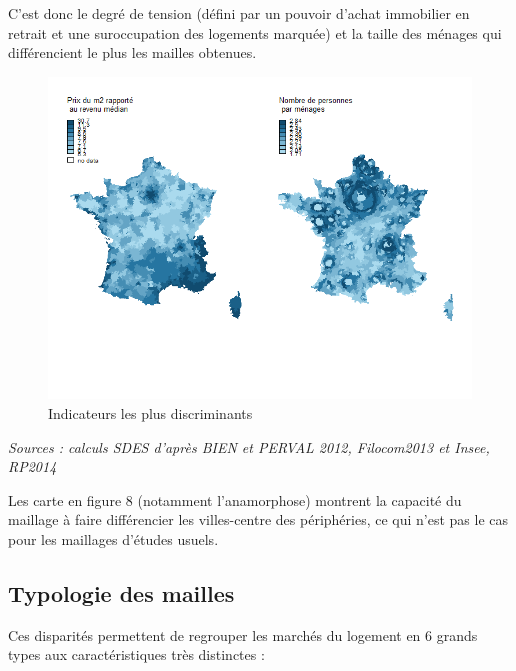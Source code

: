 \documentclass[12pt, a4paper]{article}
\begin{document}
C'est donc le degré de tension (défini par un pouvoir d'achat immobilier en retrait et une suroccupation des logements marquée) et la taille des ménages qui différencient le plus les mailles obtenues. 



\begin{figure}[H]
\caption{Indicateurs les plus discriminants}
\begin{center}
\includegraphics[scale=.8]{img/Discrim_mailles.png}
\end{center}
\end{figure}
\emph{Sources : calculs SDES d'après BIEN et PERVAL 2012, Filocom2013 et Insee, RP2014}

Les carte en figure 8 (notamment l'anamorphose) montrent la capacité du maillage à faire différencier les villes-centre des périphéries, ce qui n'est pas le cas pour les maillages d'études usuels.

\subsection{Typologie des mailles}

Ces disparités permettent de regrouper les marchés du logement en 6 grands types aux caractéristiques très distinctes :
\end{document}
